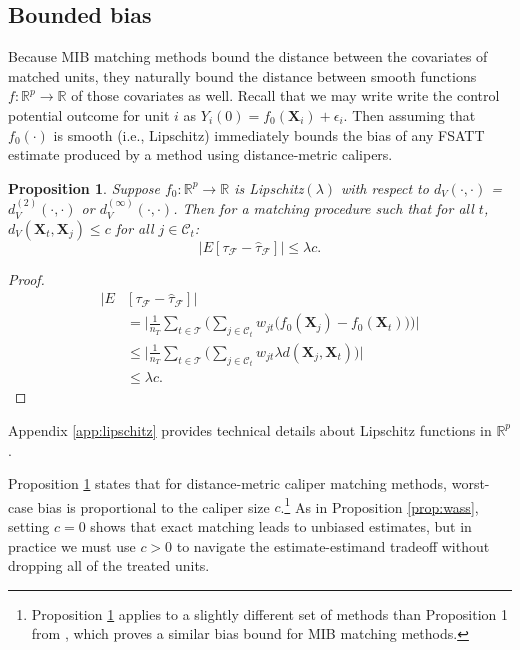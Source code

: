 \documentclass{article}
\newtheorem{proposition}[theorem]{Proposition}
\newcommand{\bX}{\mathbf{X}}
\newcommand{\Xt}{\mathbf{X}_t}
\newcommand{\Xj}{\mathbf{X}_j}
\newcommand{\R}{\mathbb{R}}
\newcommand{\Rp}{\mathbb{R}^p}
\newcommand{\Ct}{\mathcal{C}_{t}}
\begin{document}
\subsection{Bounded bias}
\label{sec:biasbd}

Because MIB matching methods bound the distance between the covariates of matched units, they naturally bound the distance between smooth functions $f:\Rp \to \R$ of those covariates as well.
Recall that we may write write the control potential outcome for unit $i$ as $Y_i(0) = f_0(\bX_i) + \epsilon_i$.
Then assuming that $f_0(\cdot)$ is smooth (i.e., Lipschitz) immediately bounds the bias of any FSATT estimate produced by a method using distance-metric calipers.
\begin{proposition}
\label{prop:biasbd_lip}
Suppose $f_0: \Rp \to \R$ is Lipschitz$(\lambda)$ with respect to $d_V(\cdot, \cdot)$ = $d^{(2)}_V(\cdot, \cdot)$ or $d^{(\infty)}_V(\cdot, \cdot)$.
Then for a matching procedure such that for all $t$, $d_V(\Xt, \Xj) \leq c$ for all $j \in \Ct$:
\begin{equation*}
    \big|E[\tau_\mathcal{F} - \hat{\tau}_\mathcal{F}] \big| \leq \lambda c.
\end{equation*}
\end{proposition}
\begin{proof}
    \begin{align*}
        \big| E &[\tau_\mathcal{F} - \hat{\tau}_\mathcal{F} ] \big| \\
        &= \bigg| \frac{1}{n_T} \sum_{t \in \mathcal{T}} 
            \Big( \sum_{j \in \Ct} w_{jt} \big(f_0(\Xj) - f_0(\Xt)\big) \Big) \bigg| \\
        &\leq \bigg| \frac{1}{n_T} \sum_{t \in \mathcal{T}} 
            \Big( \sum_{j \in \Ct} w_{jt} \lambda d(\Xj, \Xt) \Big) \bigg| \\
        &\leq \lambda c.
    \end{align*}
\end{proof}
Appendix \ref{app:lipschitz} provides technical details about Lipschitz functions in $\Rp$.

Proposition \ref{prop:biasbd_lip} states that for distance-metric caliper matching methods, worst-case bias is proportional to the caliper size $c$.\footnote{Proposition \ref{prop:biasbd_lip} applies to a slightly different set of methods than Proposition 1 from \citet{iacus2011multivariate}, which proves a similar bias bound for MIB matching methods.}
As in Proposition \ref{prop:wass}, setting $c=0$ shows that exact matching leads to unbiased estimates, but in practice we must use $c > 0$ to navigate the estimate-estimand tradeoff without dropping all of the treated units.
\end{document}
